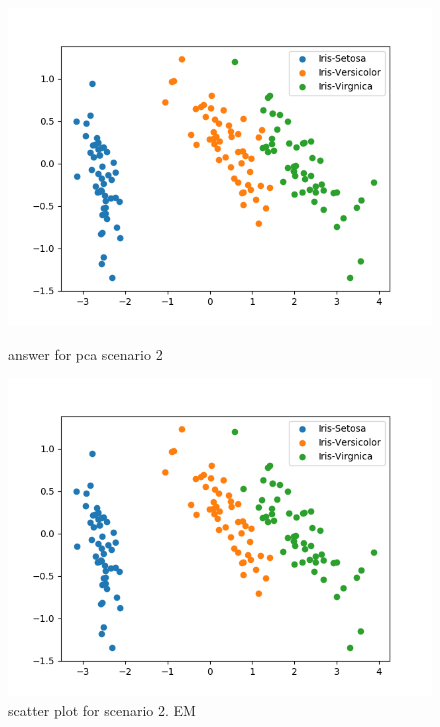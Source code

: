\documentclass[a4paper]{article}
\begin{document}
        \begin{figure}[h!]
            \centering
            \begin{minipage}[t]{6.5cm}
              \includegraphics[width=1.0\textwidth]{pca_em_2_ans.png}
              \caption{answer for pca scenario 2}
            \end{minipage}
            \hspace{2cm}
            \begin{minipage}[t]{6.5cm}
              \includegraphics[width=1.0\textwidth]{pca_em_2_1.png}
              \caption{scatter plot for scenario 2. EM}
            \end{minipage}
            \begin{minipage}[t]{6.5cm}

\end{minipage}
\end{figure}
\end{document}
